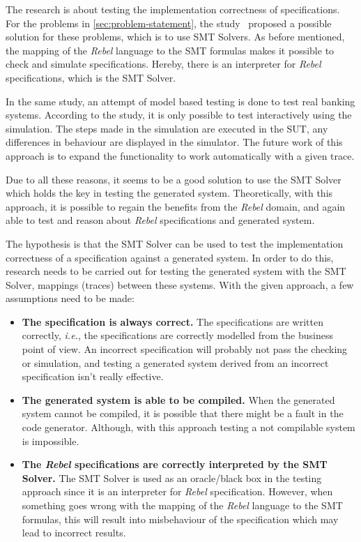 The research is about testing the implementation correctness of specifications.
For the problems in \autoref{sec:problem-statement}, the
study~\cite[p.3]{stoelcase} proposed a possible solution for these problems,
which is to use SMT Solvers. As before mentioned, the mapping of the \textit{Rebel}
language to the SMT formulas makes it possible to check and simulate
specifications. Hereby, there is an interpreter for \textit{Rebel} specifications, which
is the SMT Solver.~\cite[p.5]{stoel_storm_vinju_bosman_2016}

In the same study,
an attempt of model based testing is done to test real banking systems.
According to the study, it is only possible to test interactively using the
simulation. The steps made in the simulation are executed in the SUT, any
differences in behaviour are displayed in the simulator. The future work of this
approach is to expand the functionality to work automatically with a given
trace.

Due to all these reasons, it seems to be a good solution to use the SMT
Solver which holds the key in testing the generated system. Theoretically, with
this approach, it is possible to regain the benefits from the \textit{Rebel} domain, and
again able to test and reason about \textit{Rebel} specifications and generated system.

The hypothesis is that the SMT Solver can be used to test the implementation
correctness of a specification against a generated system. In order to do this,
research needs to be carried out for testing the generated system
with the SMT Solver, mappings (traces) between these systems. With the given approach, a
few assumptions need to be made:

\begin{itemize}
\item \textbf{The specification is always correct.}
The specifications are written correctly, \textit{i.e.}, the specifications are
correctly modelled from the business point of view. An incorrect specification
will probably not pass the checking or simulation, and testing a generated
system derived from an incorrect specification isn't really effective.
\item \textbf{The generated system is able to be compiled.} When the generated
system cannot be compiled, it is possible that there might be a fault in the
code generator. Although, with this approach testing a not compilable system is
impossible.
\item \textbf{The \textit{Rebel} specifications are correctly interpreted by the SMT
Solver.} The SMT Solver is used as an oracle/black box in the testing approach
since it is an interpreter for \textit{Rebel} specification. However, when
something goes wrong with the mapping of the \textit{Rebel} language to the SMT
formulas, this will result into misbehaviour of the specification which may lead
to incorrect results.
\end{itemize}

